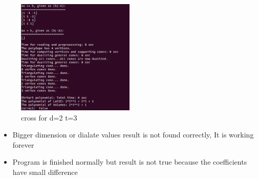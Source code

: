 \documentclass[12pt,twoside]{article}
\begin{document}
\begin{itemize}
	\begin{figure}[!h]
  		\centering
         	\includegraphics[width=0.50\textwidth]{allcross2t3.png}
		\caption{cross for d=2 t=3}
	\end{figure}	


\end{itemize}

\par
\begin{itemize}
	\item Bigger dimension or dialate values result is not found correctly, It is working forever
	\item Program is finished normally but result is not true because the coefficients have small difference 
\end{itemize}
\newpage
\end{document}
